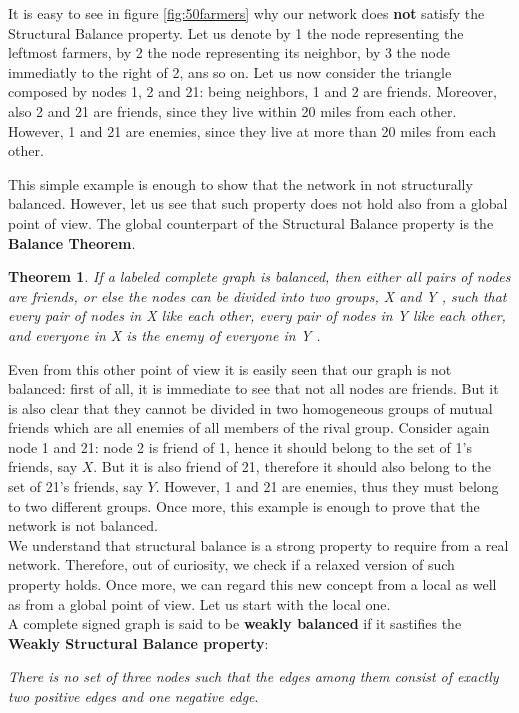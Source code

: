 \documentclass{report}
\newtheorem*{thm}{Theorem}
\theoremstyle{definition}
\theoremstyle{remark}
\begin{document}
It is easy to see in figure \ref{fig:50farmers} why our network does \textbf{not} satisfy the Structural Balance property. Let us denote by 1 the node representing the leftmost farmers, by 2 the node representing its neighbor, by 3 the node immediatly to the right of 2, ans so on. Let us now consider the triangle composed by nodes 1, 2 and 21: being neighbors, 1 and 2 are friends. Moreover, also 2 and 21 are friends, since they live within 20 miles from each other. However, 1 and 21 are enemies, since they live at more than 20 miles from each other.

This simple example is enough to show that the network in not structurally balanced. However, let us see that such property does not hold also from a global point of view. The global counterpart of the Structural Balance property is the \textbf{Balance Theorem}.
\begin{thm}
	If a labeled complete graph is balanced, then either all pairs
	of nodes are friends, or else the nodes can be divided into two groups, X and Y ,
	such that every pair of nodes in X like each other, every pair of nodes in Y like
	each other, and everyone in X is the enemy of everyone in Y .
\end{thm}
Even from this other point of view it is easily seen that our graph is not balanced: first of all, it is immediate to see that not all nodes are friends. But it is also clear that they cannot be divided in two homogeneous groups of mutual friends which are all enemies of all members of the rival group. Consider again node 1 and 21: node 2 is friend of 1, hence it should belong to the set of 1's friends, say $X$. But it is also friend of 21, therefore it should also belong to the set of 21's friends, say $Y$. However, 1 and 21 are enemies, thus they must belong to two different groups. Once more, this example is enough to prove that the network is not balanced.\\
We understand that structural balance is a strong property to require from a real network. Therefore, out of curiosity, we check if a relaxed version of such property holds. Once more, we can regard this new concept from a local as well as from a global point of view. Let us start with the local one.\\
A complete signed graph is said to be \textbf{weakly balanced} if it sastifies the \textbf{Weakly Structural Balance property}:
\bigskip

\textit{There is no set of three nodes such that the edges among them consist of exactly two positive edges and one negative edge}.
\bigskip
\end{document}
